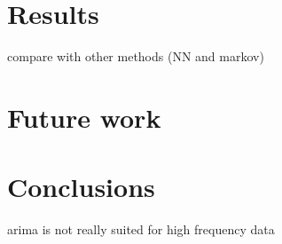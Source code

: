 \documentclass[12pt,a4paper,titlepage]{report}
\begin{document}
\section{Results}


compare with other methods (NN and markov)


\section{Future work}

\section{Conclusions}

arima is not really suited for high frequency data

\newpage


\end{document}

